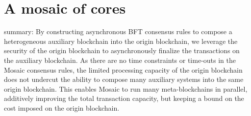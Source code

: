 \documentclass[12pt,a4paper]{article}
\begin{document}
%
%
\section{A mosaic of cores}

summary:
By constructing asynchronous BFT consensus rules to compose a heterogeneous auxiliary blockchain into the origin blockchain, we leverage the security of the origin blockchain to asynchronously finalize the transactions on the auxiliary blockchain.
As there are no time constraints or time-outs in the Mosaic consensus rules, the limited processing capacity of the origin blockchain does not undercut the ability to compose many auxiliary systems into the same origin blockchain.
This enables Mosaic to run many meta-blockchains in parallel, additively improving the total transaction capacity, but keeping a bound on the cost imposed on the origin blockchain.
%
%
\end{document}
